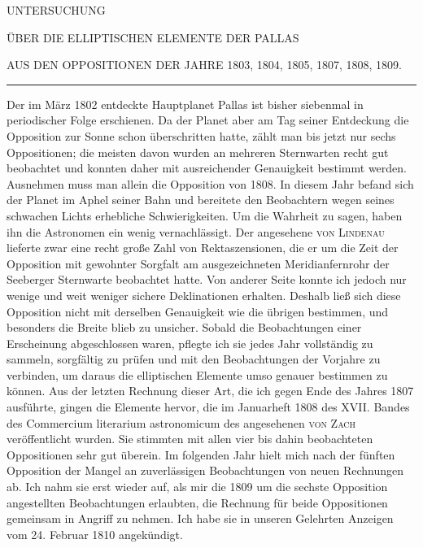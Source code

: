 \begin{center}
{\large UNTERSUCHUNG}\par\medskip
{\large ÜBER DIE ELLIPTISCHEN ELEMENTE DER PALLAS}\par\medskip
{\small AUS DEN OPPOSITIONEN DER JAHRE 1803, 1804, 1805, 1807, 1808, 1809.}
\par\medskip
\rule{.09\linewidth}{.3pt}
\end{center}
Der im März 1802 entdeckte Hauptplanet Pallas ist bisher siebenmal in periodischer Folge erschienen. Da der Planet aber am Tag seiner Entdeckung die Opposition zur Sonne schon überschritten hatte, zählt man bis jetzt nur sechs Oppositionen; die meisten davon wurden an mehreren Sternwarten recht gut beobachtet und konnten daher mit ausreichender Genauigkeit bestimmt werden. Ausnehmen muss man allein die Opposition von 1808. In diesem Jahr befand sich der Planet im Aphel seiner Bahn und bereitete den Beobachtern wegen seines schwachen Lichts erhebliche Schwierigkeiten. Um die Wahrheit zu sagen, haben ihn die Astronomen ein wenig vernachlässigt. Der angesehene \textsc{von Lindenau} lieferte zwar eine recht große Zahl von Rektaszensionen, die er um die Zeit der Opposition mit gewohnter Sorgfalt am ausgezeichneten Meridianfernrohr der Seeberger Sternwarte beobachtet hatte. Von anderer Seite konnte ich jedoch nur wenige und weit weniger sichere Deklinationen erhalten. Deshalb ließ sich diese Opposition nicht mit derselben Genauigkeit wie die übrigen bestimmen, und besonders die Breite blieb zu unsicher.
Sobald die Beobachtungen einer Erscheinung abgeschlossen waren, pflegte ich sie jedes Jahr vollständig zu sammeln, sorgfältig zu prüfen und mit den Beobachtungen der Vorjahre zu verbinden, um daraus die elliptischen Elemente umso \SourceGathering{1\textsuperscript{*}}genauer bestimmen zu können. Aus der letzten Rechnung dieser Art, die ich gegen Ende des Jahres 1807 ausführte, gingen die Elemente hervor, die im Januarheft 1808 des XVII. Bandes des Commercium literarium astronomicum des angesehenen \textsc{von Zach} veröffentlicht wurden. Sie stimmten mit allen vier bis dahin beobachteten Oppositionen sehr gut überein. Im folgenden Jahr hielt mich nach der fünften Opposition der Mangel an zuverlässigen Beobachtungen von neuen Rechnungen ab. Ich nahm sie erst wieder auf, als mir die 1809 um die sechste Opposition angestellten Beobachtungen erlaubten, die Rechnung für beide Oppositionen gemeinsam in Angriff zu nehmen. Ich habe sie in unseren Gelehrten Anzeigen vom 24. Februar 1810 angekündigt.

